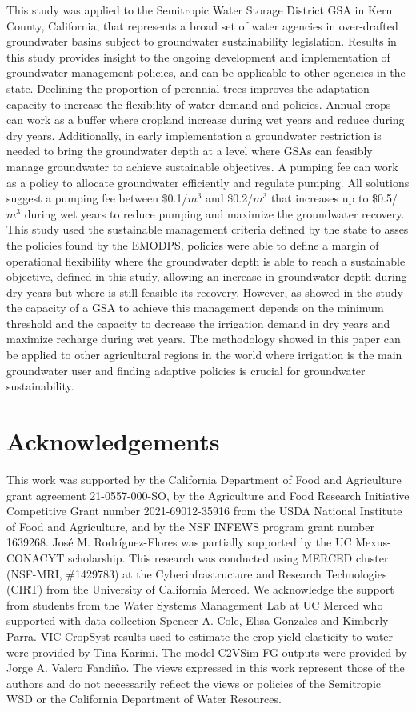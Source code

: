 \documentclass[11pt,a4paper]{article}
\begin{document}
This study was applied to the Semitropic Water Storage District GSA in Kern County, California, that represents a broad set of water agencies in over-drafted groundwater basins subject to groundwater sustainability legislation. Results in this study provides insight to the ongoing development and implementation of groundwater management policies, and can be applicable to other agencies in the state. Declining the proportion of perennial trees improves the adaptation capacity to increase the flexibility of water demand and policies. Annual crops can work as a buffer where cropland increase during wet years and reduce during dry years. Additionally, in early implementation a groundwater restriction is needed to bring the groundwater depth at a level where GSAs can feasibly manage groundwater to achieve sustainable objectives. A pumping fee can work as a policy to allocate groundwater efficiently and regulate pumping. All solutions suggest a pumping fee between \$0.1/$m^3$ and \$0.2/$m^3$ that increases up to \$0.5/$m^3$ during wet years to reduce pumping and maximize the groundwater recovery. This study used the sustainable management criteria defined by the state to asses the policies found by the EMODPS, policies were able to define a margin of operational flexibility where the groundwater depth is able to reach a sustainable objective, defined in this study, allowing an increase in groundwater depth during dry years but where is still feasible its recovery. However, as showed in the study the capacity of a GSA to achieve this management depends on the minimum threshold and the capacity to decrease the irrigation demand in dry years and maximize recharge during wet years. The methodology showed in this paper can be applied to other agricultural regions in the world where irrigation is the main groundwater user and finding adaptive policies is crucial for groundwater sustainability.

\section*{Acknowledgements}

This work was supported by the California Department of Food and Agriculture grant agreement 21-0557-000-SO, by the Agriculture and Food Research Initiative Competitive Grant number 2021-69012-35916 from the USDA National Institute of Food and Agriculture, and by the NSF INFEWS program grant number 1639268. José M. Rodríguez-Flores was partially supported by the UC Mexus-CONACYT scholarship. This research was conducted using MERCED cluster (NSF-MRI, \#1429783) at the Cyberinfrastructure and Research Technologies (CIRT) from the University of California Merced. We acknowledge the support from students from the Water Systems Management Lab at UC Merced who supported with data collection Spencer A. Cole, Elisa Gonzales and Kimberly Parra. VIC-CropSyst results used to estimate the crop yield elasticity to water were provided by Tina Karimi. The model C2VSim-FG outputs were provided by Jorge A. Valero Fandiño. The views expressed in this work represent those of the authors and do not necessarily reflect the views or policies of the Semitropic WSD or the California Department of Water Resources.
\end{document}
